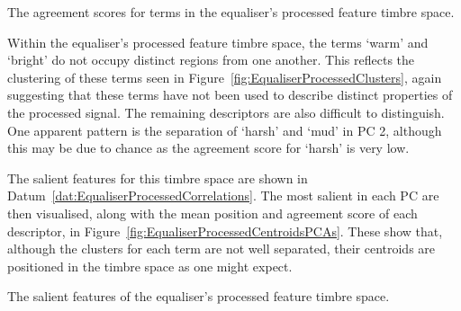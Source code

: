 			\begin{table}[h!]
				\centering
				
				\caption{The agreement scores for terms in the 
					 equaliser's processed feature timbre space.}
				\label{tab:EqualiserProcessedAgreements}
			\end{table}

			Within the equaliser's processed feature timbre space, the terms `warm' and `bright' do not occupy
			distinct regions from one another. This reflects the clustering of these terms seen in
			Figure~\ref{fig:EqualiserProcessedClusters}, again suggesting that these terms have not been used
			to describe distinct properties of the processed signal. The remaining descriptors are also
			difficult to distinguish. One apparent pattern is the separation of `harsh' and `mud' in PC 2,
			although this may be due to chance as the agreement score for `harsh' is very low.

			The salient features for this timbre space are shown in
			Datum~\ref{dat:EqualiserProcessedCorrelations}. The most salient in each PC are then visualised,
			along with the mean position and agreement score of each descriptor, in
			Figure~\ref{fig:EqualiserProcessedCentroidsPCAs}. These show that, although the clusters for each
			term are not well separated, their centroids are positioned in the timbre space as one might
			expect.

			\begin{datum}[h!]
				\centering
				\begin{minipage}{0.9\textwidth}
					
				\end{minipage}
				\caption{The salient features of the equaliser's
					 processed feature timbre space.}
				\label{dat:EqualiserProcessedCorrelations}
			\end{datum}


